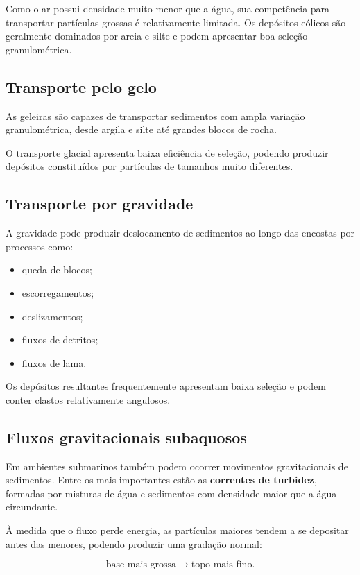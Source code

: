 Como o ar possui densidade muito menor que a água, sua competência para
transportar partículas grossas é relativamente limitada. Os depósitos eólicos
são geralmente dominados por areia e silte e podem apresentar boa seleção
granulométrica.

\subsection{Transporte pelo gelo}

As geleiras são capazes de transportar sedimentos com ampla variação
granulométrica, desde argila e silte até grandes blocos de rocha.

O transporte glacial apresenta baixa eficiência de seleção, podendo produzir
depósitos constituídos por partículas de tamanhos muito diferentes.

\subsection{Transporte por gravidade}

A gravidade pode produzir deslocamento de sedimentos ao longo das encostas por
processos como:

\begin{itemize}
    \item queda de blocos;
    \item escorregamentos;
    \item deslizamentos;
    \item fluxos de detritos;
    \item fluxos de lama.
\end{itemize}

Os depósitos resultantes frequentemente apresentam baixa seleção e podem conter
clastos relativamente angulosos.

\subsection{Fluxos gravitacionais subaquosos}

Em ambientes submarinos também podem ocorrer movimentos gravitacionais de
sedimentos. Entre os mais importantes estão as \textbf{correntes de turbidez},
formadas por misturas de água e sedimentos com densidade maior que a água
circundante.

À medida que o fluxo perde energia, as partículas maiores tendem a se depositar
antes das menores, podendo produzir uma gradação normal:

\[
\text{base mais grossa}
\rightarrow
\text{topo mais fino}.
\]

